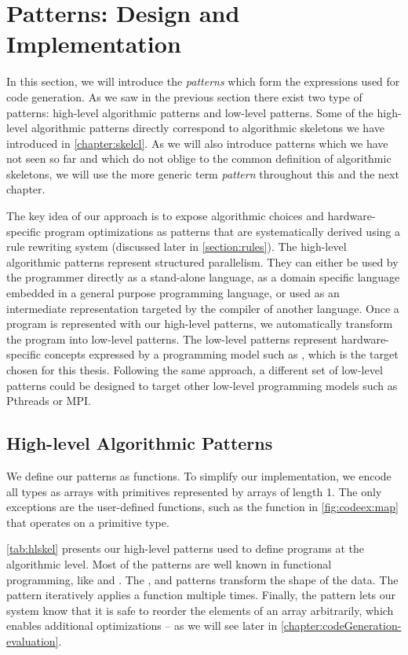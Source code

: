 \section{Patterns: Design and Implementation}
\label{section:patterns}

In this section, we will introduce the \emph{patterns} which form the expressions used for code generation.
As we saw in the previous section there exist two type of patterns: high-level algorithmic patterns and low-level \OpenCL patterns.
Some of the high-level algorithmic patterns directly correspond to algorithmic skeletons we have introduced in \autoref{chapter:skelcl}.
As we will also introduce patterns which we have not seen so far and which do not oblige to the common definition of algorithmic skeletons, we will use the more generic term \emph{pattern} throughout this and the next chapter.

The key idea of our approach is to expose algorithmic choices and hardware-specific program optimizations as patterns that are systematically derived using a rule rewriting system (discussed later in \autoref{section:rules}).
The high-level algorithmic patterns represent structured parallelism.
They can either be used by the programmer directly as a stand-alone language, as a domain specific language embedded in a general purpose programming language, or used as an intermediate representation targeted by the compiler of another language.
Once a program is represented with our high-level patterns, we automatically transform the program into low-level patterns.
The low-level patterns represent hardware-specific concepts expressed by a programming model such as \OpenCL, which is the target chosen for this thesis.
Following the same approach, a different set of low-level patterns could be designed to target other low-level programming models such as Pthreads or MPI.


\subsection{High-level Algorithmic Patterns}

We define our patterns as functions.
To simplify our implementation, we encode all types as arrays with primitives represented by arrays of length 1.
The only exceptions are the user-defined functions, such as the  function in \autoref{fig:codeex:map} that operates on a primitive type.

\autoref{tab:hlskel} presents our high-level patterns used to define programs at the algorithmic level.
Most of the patterns are well known in functional programming, like \map and \reduce.
The \zip, \splitN and \join patterns transform the shape of the data.
The \iterateN pattern iteratively applies a function multiple times.
Finally, the \reorder pattern lets our system know that it is safe to reorder the elements of an array arbitrarily, which enables additional optimizations -- as we will see later in \autoref{chapter:codeGeneration-evaluation}.

